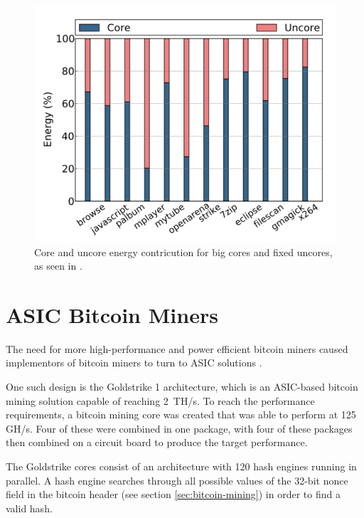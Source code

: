 \begin{figure}[htb]
    \centering
    \includegraphics[width=1.0\textwidth]{Figures/Heterogeneous/Uncore3}
    \caption{Core and uncore energy contricution for big cores and fixed uncores, as seen in \cite{heterogeneous-uncore}.}
    \label{fig:Uncore3}
\end{figure}


\section{ASIC Bitcoin Miners}

The need for more high-performance and power efficient bitcoin miners caused implementors of bitcoin
miners to turn to ASIC solutions \cite{bespoke-silicon}.

One such design is the Goldstrike 1 architecture, which is an ASIC-based bitcoin mining solution capable
of reaching 2~TH/s. To reach the performance requirements, a bitcoin mining core was created that was
able to perform at 125 GH/s. Four of these were combined in one package, with four of these packages
then combined on a circuit board to produce the target performance.

The Goldstrike cores consist of an architecture with 120 hash engines running in parallel.
A hash engine searches through all possible values of the 32-bit nonce field in the bitcoin header
(see section \ref{sec:bitcoin-mining}) in order to find a valid hash.

